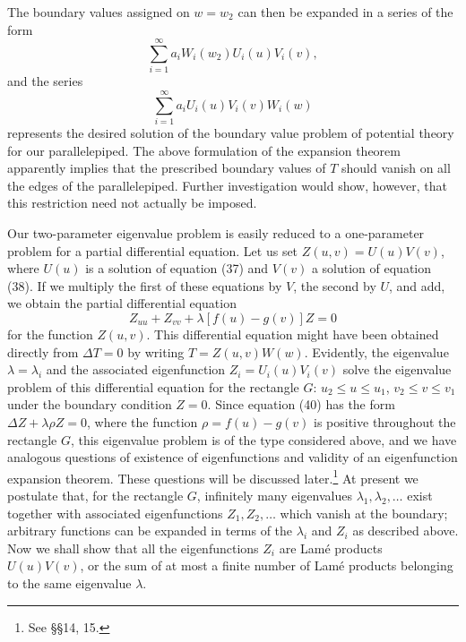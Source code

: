 The boundary values assigned on $w=w_2$ can then be expanded in a series of the form
\[
\sum_{i=1}^{\infty}a_iW_i(w_2)U_i(u)V_i(v),
\]
and the series
\[
\sum_{i=1}^{\infty}a_iU_i(u)V_i(v)W_i(w)
\]
represents the desired solution of the boundary value problem of potential theory for our parallelepiped. The above formulation of the expansion theorem apparently implies that the prescribed boundary values of $T$ should vanish on all the edges of the parallelepiped. Further investigation would show, however, that this restriction need not actually be imposed.

Our two-parameter eigenvalue problem is easily reduced to a one-parameter problem for a partial differential equation. Let us set $Z(u,v)=U(u)V(v)$, where $U(u)$ is a solution of equation (37) and $V(v)$ a solution of equation (38). If we multiply the first of these equations by $V$, the second by $U$, and add, we obtain the partial differential equation
\begin{equation}
Z_{uu}+Z_{vv}+\lambda[f(u)-g(v)]Z=0
\tag{40}
\end{equation}
for the function $Z(u,v)$. This differential equation might have been obtained directly from $\Delta T=0$ by writing $T=Z(u,v)W(w)$. Evidently, the eigenvalue $\lambda=\lambda_i$ and the associated eigenfunction $Z_i=U_i(u)V_i(v)$ solve the eigenvalue problem of this differential equation for the rectangle $G$: $u_2\le u\le u_1$, $v_2\le v\le v_1$ under the boundary condition $Z=0$. Since equation (40) has the form $\Delta Z+\lambda\rho Z=0$, where the function $\rho=f(u)-g(v)$ is positive throughout the rectangle $G$, this eigenvalue problem is of the type considered above, and we have analogous questions of existence of eigenfunctions and validity of an eigenfunction expansion theorem. These questions will be discussed later.\footnote{See \S\S14, 15.} At present we postulate that, for the rectangle $G$, infinitely many eigenvalues $\lambda_1,\lambda_2,\ldots$ exist together with associated eigenfunctions $Z_1,Z_2,\ldots$ which vanish at the boundary; arbitrary functions can be expanded in terms of the $\lambda_i$ and $Z_i$ as described above. Now we shall show that all the eigenfunctions $Z_i$ are Lam\'e products $U(u)V(v)$, or the sum of at most a finite number of Lam\'e products belonging to the same eigenvalue $\lambda$.

